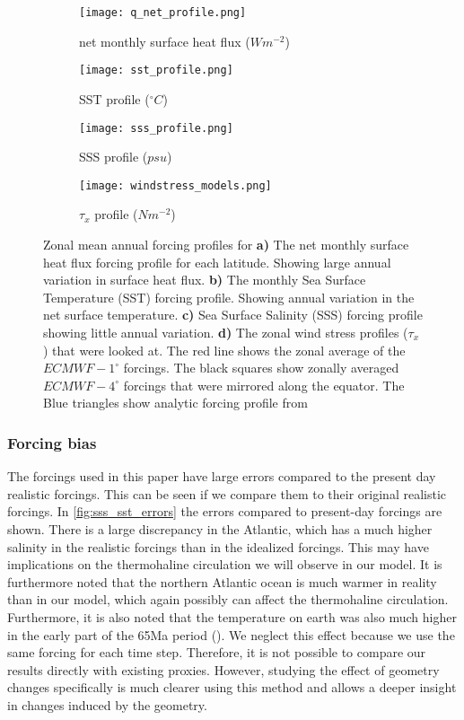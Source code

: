 \begin{figure}[H]
\begin{subfigure}{.5\textwidth}
	\caption{net monthly surface heat flux ($Wm^{-2}$)}
	\label{fig:qnet}
	\texttt{[image: q\_net\_profile.png]}
\end{subfigure}
\begin{subfigure}{.5\textwidth}
	\caption{SST profile ($^{\circ}C$)}
	\label{fig:sst_profile}
	\texttt{[image: sst\_profile.png]}
	
\end{subfigure}
\begin{subfigure}{.5\textwidth}
	\caption{SSS profile ($psu$)}
	\label{fig:sss_profile}
	\texttt{[image: sss\_profile.png]}
\end{subfigure}
\begin{subfigure}{.5\textwidth}
	\caption{$\tau_x$ profile ($Nm^{-2}$)}
	\label{fig:tau_profile}
	\texttt{[image: windstress\_models.png]}
\end{subfigure}
\caption{Zonal mean annual forcing profiles for \textbf{a)} The net monthly surface heat flux forcing profile for each latitude. Showing large annual variation in surface heat flux. \textbf{b)} The monthly Sea Surface Temperature (SST) forcing profile. Showing annual variation in the net surface temperature. \textbf{c)} Sea Surface Salinity (SSS) forcing profile showing little annual variation. \textbf{d)} The zonal wind stress profiles ($\tau_x$) that were looked at. The red line shows the zonal average of the $ECMWF-1^{\circ}$ forcings. The black squares show zonally averaged $ECMWF-4^{\circ}$ forcings that were mirrored along the equator. The Blue triangles show analytic forcing profile from \cite{bryan1987parameter}}
\label{fig:idealized_forc}
\end{figure}
\newpage
\begin{multicols}{2}
 \subsubsection{Forcing bias} \label{sec:forc_err}
The forcings used in this paper have large errors compared to the present day realistic forcings. This can be seen if we compare them to their original realistic forcings. In \cref{fig:sss_sst_errors} the errors compared to present-day forcings are shown. There is a large discrepancy in the Atlantic, which has a much higher salinity in the realistic forcings than in the idealized forcings. This may have implications on the thermohaline circulation we will observe in our model. It is furthermore noted that the northern Atlantic ocean is much warmer in reality than in our model, which again possibly can affect the thermohaline circulation.
Furthermore, it is also noted that the temperature on earth was also much higher in the early part of the 65Ma period (\cite{Hansen2013Oct}). We neglect this effect because we use the same forcing for each time step. Therefore, it is not possible to compare our results directly with existing proxies. However, studying the effect of geometry changes specifically is much clearer using this method and allows a deeper insight in changes induced by the geometry.

\end{multicols}
